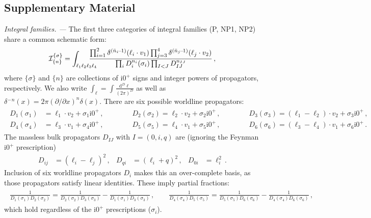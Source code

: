 \documentclass[twocolumn,superscriptaddress,amsmath, amssymb, amsfonts,preprintnumbers,aps,prd,longbibliography,nofootinbib]{revtex4-2}
\renewcommand{\sec}[1]{\textit{#1. --- }}
\renewcommand{\i}{\ensuremath{\mathrm{i}}}
\def\dd{\delta\!\!\!{}^-\!}
\begin{document}
\clearpage




\appendix
\begin{widetext}
\section*{Supplementary Material}


\sec{Integral families}
The first three categories of integral families {(P, NP1, NP2)} share a common schematic form:
\begin{align}\label{integralSchematic}
  {\cal I}_{\{n\}}^{\{\sigma\}}
  =
  \int_{\ell_1\ell_2\ell_3\ell_4}\!\!\!\!\!\!\!\!
  \frac{
    \prod_{i=1}^{2}\dd^{(\bar{n}_i\!-\!1)}(\ell_i\cdot v_1)

    \prod_{j=3}^{4}\dd^{(\bar{n}_j\!-\!1)}(\ell_j\cdot v_2)

    }{
    \prod_{i}D_{i}^{n_{i}}(\sigma_{i})
    \prod_{I<J}D_{IJ}^{n_{IJ}}
    }\,,
\end{align}
where $\{\sigma\}$ and $\{n\}$ are collections of $\i 0^+$ signs and integer powers of propagators, respectively. We also write $\int_{\ell}= \int\!\!\frac{\mathrm d^{D}\ell}{(2\pi)^{D}}$
as well as $\dd^{n}(x)=2\pi (\partial/\partial x)^{n}\delta(x)$.
There are six possible worldline propagators:
\begin{align}
\begin{aligned}
  D_1(\sigma_1)&=\ell_1\cdot v_2+\sigma_1 \i 0^+\,, \qquad\qquad
  D_2(\sigma_2)=\ell_2\cdot v_2+\sigma_2 \i 0^+\,,\qquad \qquad
  D_3(\sigma_3)=(\ell_1-\ell_2)\cdot v_2+\sigma_3\i 0^+\,,\\
  D_4(\sigma_4)&=\ell_3\cdot v_1+\sigma_4 \i 0^+\,, \qquad\qquad
  D_5(\sigma_5)=\ell_4\cdot v_1+\sigma_5 \i 0^+\,, \qquad\qquad
  D_6(\sigma_6)=(\ell_3-\ell_4)\cdot v_1+\sigma_6 \i 0^+\,.
\end{aligned}
\end{align}
The massless bulk propagators $D_{IJ}$ with $I=(0,i,q)$ are (ignoring the Feynman $\i 0^{+}$ prescription)
\begin{align}\label{DIJs}
  D_{ij}&=(\ell_i-\ell_j)^2
  \,,&
  D_{qi}&=(\ell_i+q)^2
  \,,&
  D_{0i}&=\ell_i^2
  \,.
\end{align}
Inclusion of six worldline propagators $D_i$ makes this an over-complete basis, as those propagators satisfy linear identities.
These imply partial fractions:
\begin{align}\label{partialFractions}
\begin{aligned}
  \frac{1}{D_1(\sigma_1)D_2(\sigma_2)}=\frac{1}{D_2(\sigma_2)D_3(\sigma_3)}-\frac{1}{D_1(\sigma_1)D_3(\sigma_3)}\,,\qquad
  \frac{1}{D_4(\sigma_4)D_5(\sigma_5)}=\frac{1}{D_5(\sigma_5)D_6(\sigma_6)}-\frac{1}{D_4(\sigma_4)D_6(\sigma_6)}\,,
\end{aligned}
\end{align}
which hold regardless of the $\i0^+$ prescriptions ($\sigma_i$).


\end{widetext}
\end{document}
